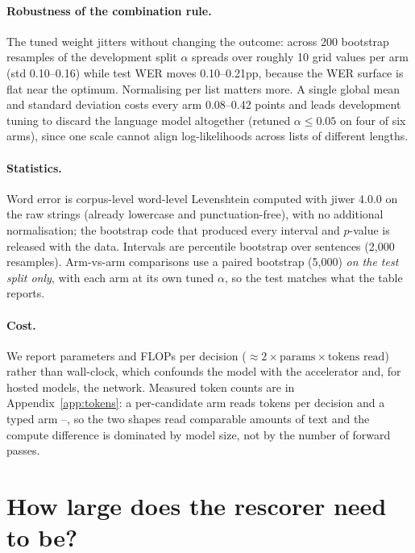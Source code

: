 \documentclass[11pt]{article}
\begin{document}
\paragraph{Robustness of the combination rule.} The tuned weight jitters without changing
the outcome: across 200 bootstrap resamples of the development split $\alpha$ spreads over
roughly 10 grid values per arm (std 0.10--0.16) while test WER moves 0.10--0.21pp, because
the WER surface is flat near the optimum. Normalising per list matters more. A single
global mean and standard deviation costs every arm 0.08--0.42 points and leads development
tuning to discard the language model altogether (retuned $\alpha \le 0.05$ on four of six
arms), since one scale cannot align log-likelihoods across lists of different lengths.

\paragraph{Statistics.} Word error is corpus-level word-level Levenshtein computed with
jiwer 4.0.0 on the raw strings (already lowercase and punctuation-free), with no
additional normalisation; the bootstrap code that produced every interval and $p$-value
is released with the data. Intervals are percentile bootstrap over sentences (2{,}000
resamples). Arm-vs-arm comparisons use a paired bootstrap (5{,}000) \emph{on the test split
only}, with each arm at its own tuned $\alpha$, so the test matches what the table reports.

\paragraph{Cost.} We report parameters and FLOPs per decision
($\approx 2 \times \text{params} \times \text{tokens read}$) rather than wall-clock, which
confounds the model with the accelerator and, for hosted models, the network. Measured
token counts are in Appendix~\ref{app:tokens}: a per-candidate arm reads \tokPerCand{}
tokens per decision and a typed arm \tokTypedOpt--\tokTypedQwen{}, so the two shapes read
comparable amounts of text and the compute difference is dominated by model size, not by
the number of forward passes.

\section{How large does the rescorer need to be?}
\label{sec:efficiency}

\begin{table}[t]
\centering\small

\caption{Real T15 data, \nTest{} held-out test sentences, identical 100-best lists from
the published decoder, $\alpha$ tuned per arm on a disjoint development split. Bold: the
efficiency comparison. At the published acoustic weight (0.3), across a 93$\times$
parameter range word error moves three-tenths of a point; after Holm correction only Jev
clears significance. Table~\ref{tab:joint} re-tunes that weight.}
\label{tab:main}
\end{table}
\end{document}
